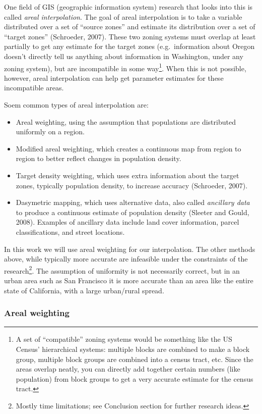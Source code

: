 \documentclass[12pt,twoside]{reedthesis}
\begin{document}
One field of GIS (geographic information system) research that looks into this is called \emph{areal interpolation}. The goal of areal interpolation is to take a variable distributed over a set of ``source zones'' and estimate its distribution over a set of ``target zones'' (Schroeder, 2007). These two zoning systems must overlap at least partially to get any estimate for the target zones (e.g.~information about Oregon doesn't directly tell us anything about information in Washington, under any zoning system), but are incompatible in some way\footnote{A set of ``compatible'' zoning systems would be something like the US Census' hierarchical systems: multiple blocks are combined to make a block group, multiple block groups are combined into a census tract, etc. Since the areas overlap neatly, you can directly add together certain numbers (like population) from block groups to get a very accurate estimate for the census tract.}. When this is not possible, however, areal interpolation can help get parameter estimates for these incompatible areas.

Soem common types of areal interpolation are:
\begin{itemize}
\item
  Areal weighting, using the assumption that populations are distributed uniformly on a region.
\item
  Modified areal weighting, which creates a continuous map from region to region to better reflect changes in population density.
\item
  Target density weighting, which uses extra information about the target zones, typically population density, to increase accuracy (Schroeder, 2007).
\item
  Dasymetric mapping, which uses alternative data, also called \emph{ancillary data} to produce a continuous estimate of population density (Sleeter and Gould, 2008). Examples of ancillary data include land cover information, parcel classifications, and street locations.
\end{itemize}
In this work we will use areal weighting for our interpolation. The other methods above, while typically more accurate are infeasible under the constraints of the research\footnote{Mostly time limitations; see Conclusion section for further research ideas.}. The assumption of uniformity is not necessarily correct, but in an urban area such as San Francisco it is more accurate than an area like the entire state of California, with a large urban/rural spread.

\hypertarget{areal-weighting}{%
\subsubsection{Areal weighting}\label{areal-weighting}}
\end{document}
